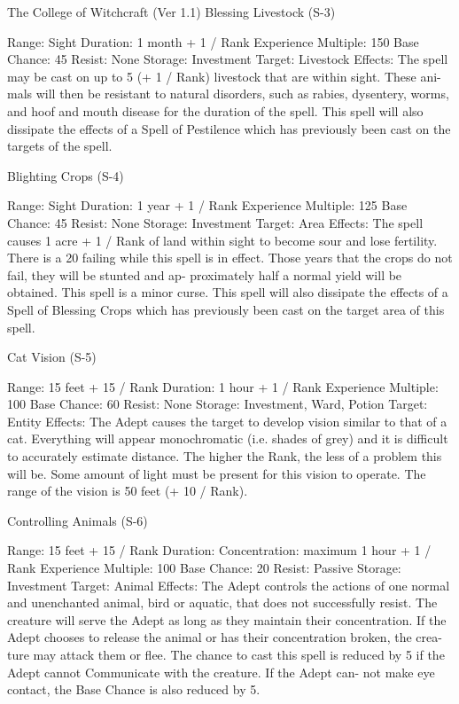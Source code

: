 \begin{Chapter}{The College of Witchcraft (Ver 1.1)}
Blessing Livestock (S-3) 

Range: Sight 
Duration: 1 month + 1 / Rank 
Experience Multiple: 150 
Base Chance: 45%
Resist: None 
Storage: Investment 
Target: Livestock 
Effects:  The  spell  may  be  cast  on  up  to  5  (+  1  / 
Rank)  livestock  that  are  within  sight.  These  ani-
mals  will  then  be  resistant  to  natural  disorders, 
such  as  rabies,  dysentery,  worms,  and  hoof  and 
mouth  disease  for  the  duration  of  the  spell.  This 
spell  will  also  dissipate  the  effects  of  a  Spell  of 
Pestilence  which  has  previously  been  cast  on  the 
targets of the spell. 

Blighting Crops (S-4) 

Range: Sight 
Duration: 1 year + 1 / Rank 
Experience Multiple: 125 
Base Chance: 45%
Resist: None 
Storage: Investment 
Target: Area 
Effects: The spell causes 1 acre + 1 / Rank of land 
within  sight  to  become  sour  and  lose  fertility. 
There is a 20%
failing while this spell is in effect. Those years that 
the  crops  do  not  fail,  they  will  be  stunted  and  ap-
proximately  half  a  normal  yield  will  be  obtained. 
This  spell  is  a  minor  curse.  This  spell  will  also 
dissipate  the  effects  of  a  Spell  of  Blessing  Crops 
which  has  previously  been  cast  on  the  target  area 
of this spell. 

Cat Vision (S-5) 

Range: 15 feet + 15 / Rank 
Duration: 1 hour + 1 / Rank 
Experience Multiple: 100 
Base Chance: 60%
Resist: None 
Storage: Investment, Ward, Potion 
Target: Entity 
Effects:  The  Adept  causes  the  target  to  develop 
vision  similar  to  that  of  a  cat.  Everything  will 
appear  monochromatic  (i.e.  shades  of  grey)  and  it 
is  difficult  to  accurately  estimate  distance.  The 
higher the Rank, the less of a problem this will be. 
Some  amount  of  light  must  be  present  for  this 
vision to operate. The range of the vision is 50 feet 
(+ 10 / Rank). 

Controlling Animals (S-6) 

Range: 15 feet + 15 / Rank 
Duration:  Concentration:  maximum  1  hour  +  1  / 
Rank 
Experience Multiple: 100 
Base Chance: 20%
Resist: Passive 
Storage: Investment 
Target: Animal 
Effects:  The  Adept  controls  the  actions  of  one 
normal  and  unenchanted  animal,  bird  or  aquatic, 
that  does  not  successfully  resist.  The  creature  will 
serve  the  Adept  as  long  as  they  maintain  their 
concentration.  If  the  Adept  chooses  to  release  the 
animal or has their concentration broken, the crea-
ture  may  attack  them  or  flee.  The  chance  to  cast 
this  spell  is  reduced  by  5  if  the  Adept  cannot 
Communicate  with  the  creature.  If  the  Adept  can-
not  make  eye  contact,  the  Base  Chance  is  also 
reduced by 5. 


\end{Chapter}
